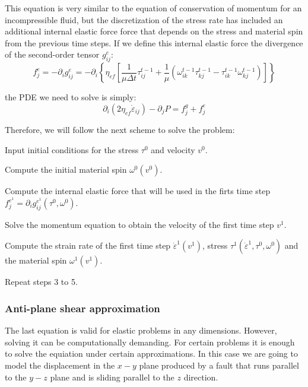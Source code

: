 This equation is very similar to the equation of conservation of momentum for an incompressible fluid, but the discretization of the stress rate has included an additional internal elastic force force that depends on the stress and material spin from the previous time steps. If we define this internal elastic force the divergence of the second-\/order tensor $ g^e_{ij}$\-: \[ f^e_j = -\partial_i g^e_{ij} = -\partial_i \left\{ \eta_{ef} \left[\frac{1}{\mu\Delta t} \tau ^{t-1}_{ij} + \frac {1}{\mu} \left( \omega^{t-1}_{ik}\tau^{t-1}_{kj} - \tau^{t-1}_{ik}\omega^{t-1}_{kj} \right) \right] \right\} \]

the P\-D\-E we need to solve is simply\-: \[ \partial_i \left(2 \eta_{ef} \dot\varepsilon_{ij} \right) - \partial_j P = f^g_j + f^e_j \]

Therefore, we will follow the next scheme to solve the problem\-:
\begin{DoxyEnumerate}
\item Input initial conditions for the stress $\tau^0$ and velocity $v^0$.
\item Compute the initial material spin $\omega^0(v^0)$.
\item Compute the internal elastic force that will be used in the firts time step $f^{e^1}_j = \partial_i g^{e^1}_{ij}(\tau^0,\omega^0)$.
\item Solve the momentum equation to obtain the velocity of the first time step $v^1$.
\item Compute the strain rate of the first time step $\dot\varepsilon^1(v^1)$, stress $\tau^1(\dot{\varepsilon}^1,\tau^0,\omega^0)$ and the material spin $\omega^1(v^1)$.
\item Repeat steps 3 to 5.
\end{DoxyEnumerate}\hypertarget{index_anti_plane}{}\subsubsection{Anti-\/plane shear approximation}\label{index_anti_plane}
The last equation is valid for elastic problems in any dimensions. However, solving it can be computationally demanding. For certain problems it is enough to solve the equiation under certain approximations. In this case we are going to model the displacement in the $x-y$ plane produced by a fault that runs parallel to the $y-z$ plane and is sliding parallel to the $z$ direction. 
